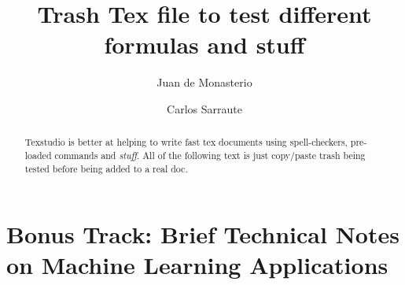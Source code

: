 \documentclass{article}%
\newcommand{\Expect}{{\mathbb{E}}}
\newtheorem{definition}{Definition}[subsection]
\theoremstyle{definition}
\begin{document}
\title{Trash Tex file to test different formulas and stuff}




\author{
	Juan de Monasterio
	\and Carlos Sarraute
}

%
%


\maketitle
\begin{abstract}
	
	Texstudio is better at helping to write fast tex documents using spell-checkers, pre-loaded commands and \textit{stuff}. All of the following text is just copy/paste trash being tested before being added to a real doc.
	



\end{abstract} 

\section{Bonus Track: Brief Technical Notes on Machine Learning Applications}\label{section-technicalObservations}
\end{document}
